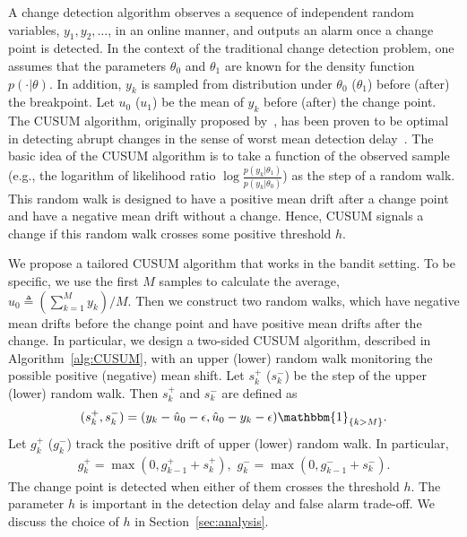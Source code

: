 \documentclass[letterpaper]{article}
\newcommand{\blue}{}
\begin{document}
A change detection algorithm observes a sequence of independent random variables, $y_1,y_2,\ldots$, in an online manner, and outputs an alarm once a change point is detected. In the context of the traditional change detection problem, one assumes that the parameters $\theta_0$ and $\theta_1$ are known for the density function $p(\cdot|\theta)$. In addition, $y_k$ is sampled from distribution under $\theta_0$ ($\theta_1$) before (after) the breakpoint. Let $u_0$ ($u_1$) be the mean of $y_k$ before (after) the change point. The CUSUM algorithm, originally proposed by~\cite{page1954continuous}, has been proven to be optimal in detecting abrupt changes in the sense of worst mean detection delay~\cite{lorden1971procedures}.
{\blue The basic idea of the CUSUM algorithm is to take a function of the observed sample (e.g., the logarithm of likelihood ratio $\log\frac{p(y_k|\theta_1)}{p(y_k|\theta_0)}$) as the step of a random walk.}
{\blue This random walk is designed to have a positive mean drift after a change point and have a negative mean drift without a change.}
Hence, {\blue CUSUM signals a change if} this random walk crosses some positive threshold $h$.

We propose a tailored CUSUM algorithm that works in the bandit setting.
To be specific, we use the first $M$ samples to calculate the average, $\hat{u}_0\triangleq({\sum_{k=1}^My_k})/{M}.$
Then we construct two random walks, which have negative mean drifts before the change point and have positive mean drifts after the change. In particular, we design a two-sided CUSUM algorithm, described in Algorithm~\ref{alg:CUSUM}, with an upper (lower) random walk monitoring the possible positive (negative) mean shift. Let $s_k^+$ ($s_k^-$) be the step of the upper (lower) random walk. Then $s_k^+$ and $s_k^-$ are defined as
\begin{equation}\label{twoCUSUM}
(s_{k}^+,s_{k}^-)=(y_k-\hat{u}_0-\epsilon,\hat{u}_0-y_k-\epsilon)\mathbbm{1}_{\{k>M\}}.
\end{equation}
Let $g_k^+$ ($g_k^-$) track the positive drift of upper (lower) random walk. In particular,
\begin{align}
\label{eqn:g+-}
g_k^+=\max(0,g_{k-1}^++s_k^+), \,\, g_k^-=\max(0,g_{k-1}^-+s_k^-).
\end{align}
The change point is detected when either of them crosses the threshold
$h$. The parameter $h$ is important in the detection delay and
false alarm trade-off. We discuss the choice of $h$ in Section~\ref{sec:analysis}.
\end{document}
